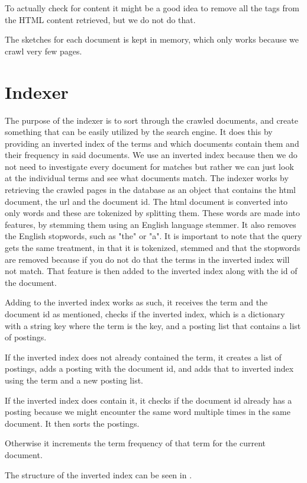 	To actually check for content it might be a good idea to remove all the tags from the HTML content retrieved, but we do not do that.
	
	The sketches for each document is kept in memory, which only works because we crawl very few pages.
	
	\section{Indexer}
	The purpose of the indexer is to sort through the crawled documents, and create something that can be easily utilized by the search engine. It does this by providing an inverted index of the terms and which documents contain them and their frequency in said documents.
	We use an inverted index because then we do not need to investigate every document for matches but rather we can just look at the individual terms and see what documents match.
	The indexer works by retrieving the crawled pages in the database as an object that contains the html document, the url and the document id.
	The html document is converted into only words and these are tokenized by splitting them. 
	These words are made into features, by stemming them using an English language stemmer. It also removes the English stopwords, such as "the" or "a".
	It is important to note that the query gets the same treatment, in that it is tokenized, stemmed and that the stopwords are removed because if you do not do that the terms in the inverted index will not match.
	That feature is then added to the inverted index along with the id of the document.
	
	Adding to the inverted index works as such, it receives the term and the document id as mentioned, checks if the inverted index, which is a dictionary with a string key where the term is the key, and a posting list that contains a list of postings.
	
	If the inverted index does not already contained the term, it creates a list of postings, adds a posting with the document id, and adds that to inverted index using the term and a new posting list.
	
	If the inverted index does contain it, it checks if the document id already has a posting because we might encounter the same word multiple times in the same document. It then sorts the postings.
	
	Otherwise it increments the term frequency of that term for the current document.
	
	The structure of the inverted index can be seen in .
	
